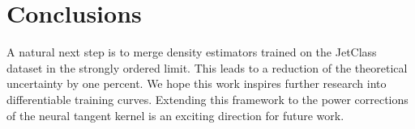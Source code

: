 \section{Conclusions}\label{sec:conclusions}

A natural next step is to merge density estimators trained on the
JetClass dataset in the strongly ordered limit. This leads to a
reduction of the theoretical uncertainty by one percent. We hope this
work inspires further research into differentiable training curves.
Extending this framework to the power corrections of the neural tangent
kernel is an exciting direction for future work.

